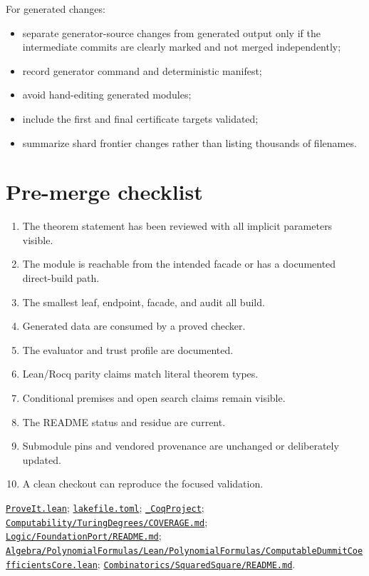 \documentclass[
  10pt,
  a4paper,
  twoside,
  open=any,
  parskip=half,
  headings=big
]{scrreprt}
\newcommand{\CommitFull}{675d0a2ff0fc624fba199e006049016ba806f40a}
\newcommand{\RepoBlobBase}{https://github.com/VladimirReshetnikov/ProveIt/blob/\CommitFull/}
\newcommand{\RepoFile}[1]{%
  \href{\RepoBlobBase\detokenize{#1}}{\nolinkurl{#1}}}
\begin{document}
For generated changes:

\begin{itemize}
  \item separate generator-source changes from generated output only if the
        intermediate commits are clearly marked and not merged independently;
  \item record generator command and deterministic manifest;
  \item avoid hand-editing generated modules;
  \item include the first and final certificate targets validated;
  \item summarize shard frontier changes rather than listing thousands of
        filenames.
\end{itemize}

\section{Pre-merge checklist}

\begin{tcolorbox}[colback=lightgray,colframe=navy,title={Extension checklist}]
\begin{enumerate}
  \item The theorem statement has been reviewed with all implicit parameters
        visible.
  \item The module is reachable from the intended facade or has a documented
        direct-build path.
  \item The smallest leaf, endpoint, facade, and audit all build.
  \item Generated data are consumed by a proved checker.
  \item The evaluator and trust profile are documented.
  \item Lean/Rocq parity claims match literal theorem types.
  \item Conditional premises and open search claims remain visible.
  \item The README status and residue are current.
  \item Submodule pins and vendored provenance are unchanged or deliberately
        updated.
  \item A clean checkout can reproduce the focused validation.
\end{enumerate}
\end{tcolorbox}

\begin{sourcebox}
\RepoFile{ProveIt.lean};
\RepoFile{lakefile.toml};
\RepoFile{_CoqProject};
\RepoFile{Computability/TuringDegrees/COVERAGE.md};
\RepoFile{Logic/FoundationPort/README.md};
\RepoFile{Algebra/PolynomialFormulas/Lean/PolynomialFormulas/ComputableDummitCoefficientsCore.lean};
\RepoFile{Combinatorics/SquaredSquare/README.md}.
\end{sourcebox}
\end{document}
